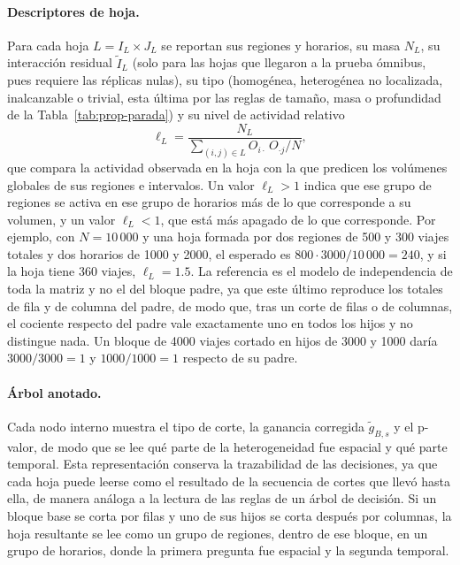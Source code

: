 \paragraph{Descriptores de hoja.} Para cada hoja $L = I_L\times J_L$ se reportan
sus regiones y horarios, su masa $N_L$, su interacción residual $\tilde I_L$ (solo
para las hojas que llegaron a la prueba ómnibus, pues requiere las réplicas nulas), su
tipo (homogénea, heterogénea no localizada, inalcanzable o trivial, esta última por
las reglas de tamaño, masa o profundidad de la Tabla~\ref{tab:prop-parada}) y su nivel de
actividad relativo
\begin{equation}\label{eq:prop-lift}
  \ell_L = \frac{N_L}{\sum_{(i,j)\in L} O_{i\cdot}\,O_{\cdot j}/N},
\end{equation}
que compara la actividad observada en la hoja con la que predicen los volúmenes
globales de sus regiones e intervalos. Un valor $\ell_L>1$ indica que ese grupo
de regiones se activa en ese grupo de horarios más de lo que corresponde a su
volumen, y un valor $\ell_L<1$, que está más apagado de lo que corresponde. Por
ejemplo, con $N=10\,000$ y una hoja formada por dos regiones de 500 y 300 viajes
totales y dos horarios de 1000 y 2000, el esperado es
$800\cdot3000/10\,000=240$, y si la hoja tiene 360 viajes, $\ell_L=1.5$. La referencia es el modelo de independencia de toda la matriz y no el
del bloque padre, ya que este último reproduce los totales de fila y de columna del
padre, de modo que, tras un corte de filas o de columnas, el cociente respecto
del padre vale exactamente uno en todos los hijos y no distingue nada. Un bloque
de 4000 viajes cortado en hijos de 3000 y 1000 daría $3000/3000=1$ y
$1000/1000=1$ respecto de su padre.

\paragraph{Árbol anotado.} Cada nodo interno muestra el tipo de corte, la
ganancia corregida $\tilde g_{B,s}$ y el p-valor, de modo que se lee qué parte de la
heterogeneidad fue espacial y qué parte temporal. Esta representación conserva la
trazabilidad de las decisiones, ya que cada hoja puede leerse como el resultado de
la secuencia de cortes que llevó hasta ella, de manera análoga a la lectura de las
reglas de un árbol de decisión. Si un bloque base se corta por filas y uno de
sus hijos se corta después por columnas, la hoja resultante se lee como un grupo
de regiones, dentro de ese bloque, en un grupo de horarios, donde la primera
pregunta fue espacial y la segunda temporal.

